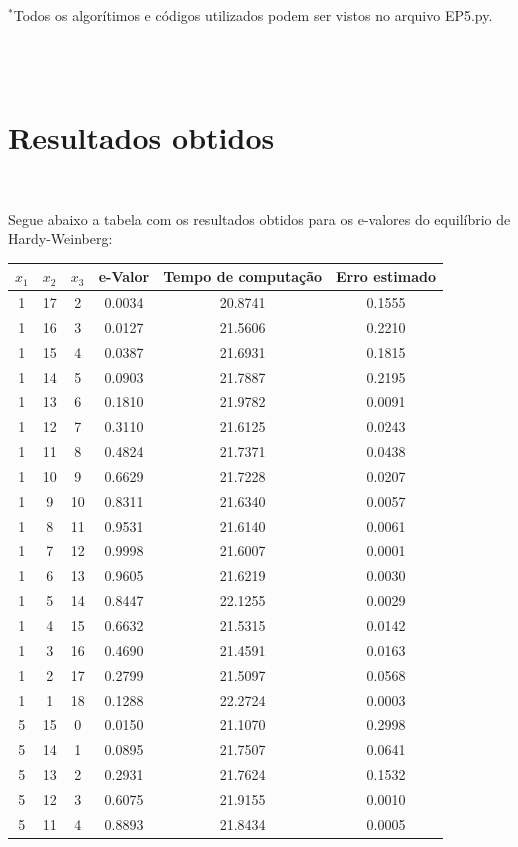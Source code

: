 \documentclass[pt12]{article}
\begin{document}
\begin{small}
$^*$Todos os algorítimos e códigos utilizados podem ser vistos no arquivo EP5.py.
\end{small}\\
\ 

\section{Resultados obtidos}
\ 

Segue abaixo a tabela com os resultados obtidos para os e-valores do equilíbrio de Hardy-Weinberg:\\

\begin{center}
\begin{tabular}{|ccc|c|c|c|}
\hline
$x_1$ & $x_2$ & $x_3$ & e-Valor & Tempo de computação& Erro estimado\\
\hline
 1& 17& 2& 0.0034& 20.8741&0.1555\\
 1& 16& 3& 0.0127& 21.5606&0.2210\\
 1& 15& 4& 0.0387& 21.6931&0.1815\\
 1& 14& 5& 0.0903& 21.7887&0.2195\\
 1& 13& 6& 0.1810& 21.9782&0.0091\\
 1& 12& 7& 0.3110& 21.6125&0.0243\\
 1& 11& 8& 0.4824& 21.7371&0.0438\\
 1& 10& 9& 0.6629& 21.7228&0.0207\\
 1& 9& 10& 0.8311& 21.6340&0.0057\\
 1& 8& 11& 0.9531& 21.6140&0.0061\\
 1& 7& 12& 0.9998& 21.6007&0.0001\\
 1& 6& 13& 0.9605& 21.6219&0.0030\\
 1& 5& 14& 0.8447& 22.1255&0.0029\\
 1& 4& 15& 0.6632& 21.5315&0.0142\\
 1& 3& 16& 0.4690& 21.4591&0.0163\\
 1& 2& 17& 0.2799& 21.5097&0.0568\\
 1& 1& 18& 0.1288& 22.2724&0.0003\\
 5& 15& 0& 0.0150& 21.1070&0.2998\\
 5& 14& 1& 0.0895& 21.7507&0.0641\\
 5& 13& 2& 0.2931& 21.7624&0.1532\\
 5& 12& 3& 0.6075& 21.9155&0.0010\\
 5& 11& 4& 0.8893& 21.8434&0.0005\\

\end{tabular}
\end{center}
\end{document}
